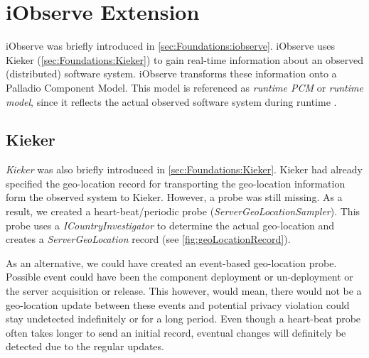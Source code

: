
\chapter{iObserve Extension}
\label{ch:iObserve}

iObserve was briefly introduced in \autoref{sec:Foundations:iobserve}. iObserve uses Kieker (\autoref{sec:Foundations:Kieker}) to gain real-time information about an observed (distributed) software system. iObserve transforms these information onto a Palladio Component Model. This model is referenced as \textit{runtime PCM} or \textit{runtime model}, since it reflects the actual observed software system during runtime \cite{Heinrich.2016}.


\section{Kieker}
\label{sec:Kieker:privacy}

\textit{Kieker} was also briefly introduced in \autoref{sec:Foundations:Kieker}. Kieker had already specified the geo-location record for transporting the geo-location information form the observed system to Kieker. However, a probe was still missing. As a result, we created a heart-beat/periodic probe (\textit{ServerGeoLocationSampler}). This probe uses a \textit{ICountryInvestigator} to determine the actual geo-location and creates a \textit{ServerGeoLocation} record (see \autoref{fig:geoLocationRecord}).

As an alternative, we could have created an event-based geo-location probe. Possible event could have been the component deployment or un-deployment or the server acquisition or release. This however, would mean, there would not be a geo-location update between these events and potential privacy violation could stay undetected indefinitely or for a long period. Even though a heart-beat probe often takes longer to send an initial record, eventual changes will definitely be detected due to the regular updates.

